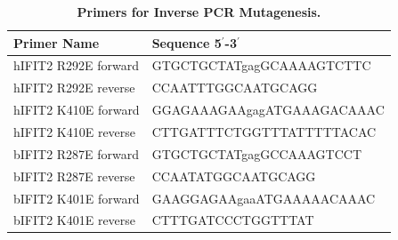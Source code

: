 \begin{table}
\centering
\begin{tabular}{ll}
\toprule
\textbf{Primer Name}   & \textbf{Sequence 5$^{\prime}$-3$^{\prime}$}    \\ \midrule
hIFIT2   R292E forward & GTGCTGCTATgagGCAAAAGTCTTC  \\ 
hIFIT2 R292E reverse   & CCAATTTGGCAATGCAGG         \\ 
hIFIT2   K410E forward & GGAGAAAGAAgagATGAAAGACAAAC \\ 
hIFIT2 K410E reverse   & CTTGATTTCTGGTTTATTTTTACAC  \\ 
bIFIT2   R287E forward & GTGCTGCTATgagGCCAAAGTCCT   \\ 
bIFIT2 R287E reverse   & CCAATATGGCAATGCAGG         \\ 
bIFIT2   K401E forward & GAAGGAGAAgaaATGAAAAACAAAC  \\ 
bIFIT2 K401E reverse   & CTTTGATCCCTGGTTTAT         \\ \bottomrule
\end{tabular}
\caption[Primers for Inverse PCR Mutagenesis.]{\textbf{Primers for Inverse PCR Mutagenesis.}}
\label{tab:Primers for Inverse PCR Mutagenesis table}
\end{table}

